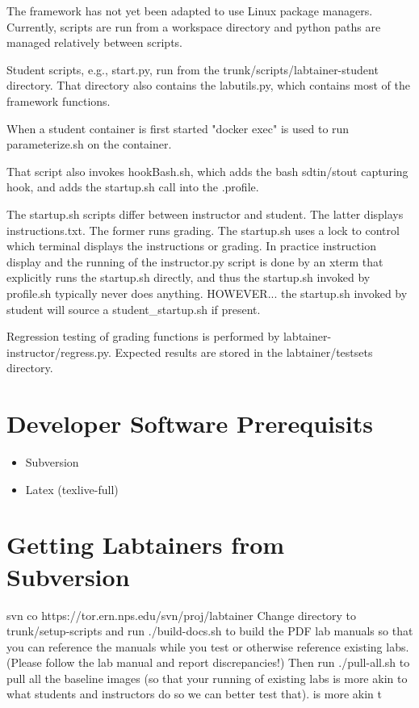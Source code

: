 The framework has not yet been adapted to use Linux package managers.
Currently, scripts are run from a workspace directory and python
paths are managed relatively between scripts.  

Student scripts, e.g., start.py, run from the trunk/scripts/labtainer-student directory.
That directory also contains the labutils.py, which contains most of the framework
functions.

When a student container is first started "docker exec" is used
to run parameterize.sh on the container.

That script also invokes hookBash.sh, which adds the bash
sdtin/stout capturing hook, and adds the startup.sh call
into the .profile.

The startup.sh scripts differ between instructor and student.  The latter
displays instructions.txt.  The former runs grading.
The startup.sh uses a lock to control which
terminal displays the instructions or grading.  In practice instruction
display and the running of the instructor.py script is done by
an xterm that explicitly runs the startup.sh directly, and thus
the startup.sh invoked by profile.sh typically never does anything.
HOWEVER... the startup.sh invoked by student will source a student_startup.sh if present.

Regression testing of grading functions is performed by labtainer-instructor/regress.py.
Expected results are stored in the labtainer/testsets directory.

\section{Developer Software Prerequisits}
\begin {itemize}
\item Subversion
\item Latex (texlive-full)
\end {itemize}


\section{Getting Labtainers from Subversion}
svn co https://tor.ern.nps.edu/svn/proj/labtainer
Change directory to trunk/setup-scripts and run ./build-docs.sh to build the PDF lab
manuals so that you can reference the manuals while you test or otherwise reference
existing labs.  (Please follow the lab manual and report discrepancies!)
Then run ./pull-all.sh to pull all the baseline images (so that your running of 
existing labs is more akin to what students and instructors do so we can better test that).
is more akin t
